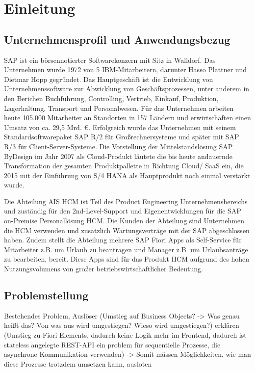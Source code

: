 \chapter{Einleitung}

\section{Unternehmensprofil und Anwendungsbezug}

SAP ist ein börsennotierter Softwarekonzern mit Sitz in Walldorf. Das Unternehmen wurde 1972 von 5 IBM-Mitarbeitern, darunter Hasso Plattner und Dietmar Hopp gegründet. Das Hauptgeschäft ist die Entwicklung von Unternehmenssoftware zur Abwicklung von Geschäftsprozessen, unter anderem in den Berichen Buchführung, Controlling, Vertrieb, Einkauf, Produktion, Lagerhaltung, Transport und Personalwesen. Für das Unternehmen arbeiten heute 105.000 Mitarbeiter an Standorten in 157 Ländern und erwirtschaften einen Umsatz von ca. 29,5 Mrd. \euro{}. Erfolgreich wurde das Unternehmen mit seinem Standardsoftwarepaket SAP R/2 für Gro{\ss}rechnersysteme und später mit SAP R/3 für Client-Server-Systeme. Die Vorstellung der Mittelstandslösung SAP ByDesign im Jahr 2007 als Cloud-Produkt läutete die bis heute andauernde Transformation der gesamten Produktpallette in Richtung Cloud/ SaaS ein, die 2015 mit der Einführung von S/4 HANA als Hauptprodukt noch einmal verstärkt wurde.

Die Abteilung AIS HCM ist Teil des Product Engineering Unternehmensbereichs und zuständig für den 2nd-Level-Support und Eigenentwicklungen für die SAP on-Premise Personallösung HCM. Die Kunden der Abteilung sind Unternehmen die HCM verwenden und zusätzlich Wartungsverträge mit der SAP abgeschlossen haben. Zudem stellt die Abteilung mehrere SAP Fiori Apps als Self-Service für Mitarbeiter z.B. um Urlaub zu beantragen und Manager z.B. um Urlaubsanträge zu bearbeiten, bereit. Diese Apps sind für das Produkt HCM aufgrund des hohen Nutzungsvolumens von gro{\ss}er betriebswirtschaftlicher Bedeutung.

\section{Problemstellung}

Bestehendes Problem, Auslöser (Umstieg auf Business Objects? -> Was genau heißt das? Von was aus wird umgestiegen? Wieso wird umgestiegen?) erklären (Umstieg zu Fiori Elements, dadurch keine Logik mehr im Frontend, dadurch ist stateless angelegte REST-API ein problem für sequentielle Prozesse, die asynchrone Kommunikation verwenden)
-> Somit müssen Möglichkeiten, wie man diese Prozesse trotzdem umsetzen kann, ausloten



